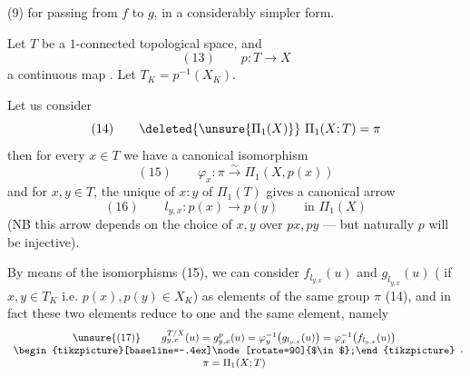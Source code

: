(9) for passing from $f$ to $g$, in a considerably simpler form.

Let $T$ be a  $1$-connected topological space, and
\[
(13)\qquad p:T\longrightarrow X
\]
a continuous map . Let $T_K=p^{-1}(X_K)$.

Let us consider 
\[
(14)\qquad\deleted{\unsure{\Pi_1(X)}}\ \Pi_1(X;T)=\pi
\]
then for every $x\in T$ we have a canonical isomorphism
\[
(15)\qquad\varphi_x:\pi\xrightarrow{\sim}\Pi_1(X,p(x))
\]
and for $x,y\in T$, the unique   of  $x:y$ of $\Pi_1(T)$ gives  a canonical arrow
\[
(16)\qquad l_{y,x}:p(x)\longrightarrow p(y)\qquad\text{in }\Pi_1(X)
\]
(NB this arrow depends on the choice of $x,y$ over $px,py$ --- but naturally $p$ will be injective).

By means of the isomorphisms (15), we can consider $f_{l_{y,x}}(u)$ and $g_{l_{y,x}}(u)$ ( if $x,y\in T_K$ i.e. $p(x),p(y)\in X_K$) as elements of the same group $\pi$ (14),  and in fact these two elements reduce to one and the same element, namely
\[
\begin{array}{c}
\unsure{(17)}\qquad g_{y,x}^{T/X}(u)=g_{y,x}^{p}(u)=\varphi_y^{-1}\bigl(g_{l_{y,x}}(u)\bigr)=\varphi_x^{-1}\bigl(f_{l_{y,x}}(u)\bigr)\\
\begin{tikzpicture}[baseline=-.4ex]\node[rotate=90]{$\in$};\end{tikzpicture}\\
\pi=\Pi_1(X;T)
\end{array}.
\]
